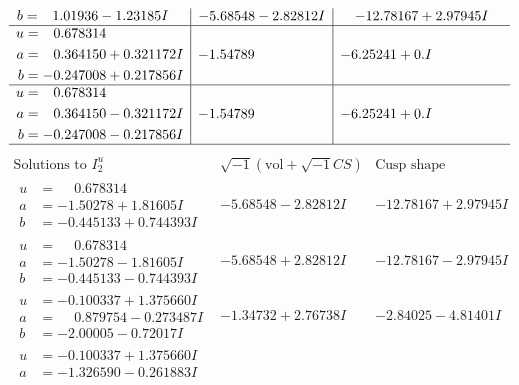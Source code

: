 \documentclass[1p]{elsarticle_modified}
\theoremstyle{definition}
\newcommand{\I}{\sqrt{-1}}
\begin{document}
$$\begin{array}{c|c|c}
\begin{aligned}
b &= \phantom{-}1.01936 - 1.23185 I\end{aligned}
 & -5.68548 - 2.82812 I & -12.78167 + 2.97945 I \\ \hline\begin{aligned}
u &= \phantom{-}0.678314\phantom{ +0.000000I} \\
a &= \phantom{-}0.364150 + 0.321172 I \\
b &= -0.247008 + 0.217856 I\end{aligned}
 & -1.54789\phantom{ +0.000000I} & -6.25241 + 0. I\phantom{ +0.000000I} \\ \hline\begin{aligned}
u &= \phantom{-}0.678314\phantom{ +0.000000I} \\
a &= \phantom{-}0.364150 - 0.321172 I \\
b &= -0.247008 - 0.217856 I\end{aligned}
 & -1.54789\phantom{ +0.000000I} & -6.25241 + 0. I\phantom{ +0.000000I}\\
 \hline 
 \end{array}$$\newpage$$\begin{array}{c|c|c}  
\text{Solutions to }I^u_{2}& \I (\text{vol} + \sqrt{-1}CS) & \text{Cusp shape}\\
 \hline 
\begin{aligned}
u &= \phantom{-}0.678314\phantom{ +0.000000I} \\
a &= -1.50278 + 1.81605 I \\
b &= -0.445133 + 0.744393 I\end{aligned}
 & -5.68548 - 2.82812 I & -12.78167 + 2.97945 I \\ \hline\begin{aligned}
u &= \phantom{-}0.678314\phantom{ +0.000000I} \\
a &= -1.50278 - 1.81605 I \\
b &= -0.445133 - 0.744393 I\end{aligned}
 & -5.68548 + 2.82812 I & -12.78167 - 2.97945 I \\ \hline\begin{aligned}
u &= -0.100337 + 1.375660 I \\
a &= \phantom{-}0.879754 - 0.273487 I \\
b &= -2.00005 - 0.72017 I\end{aligned}
 & -1.34732 + 2.76738 I & -2.84025 - 4.81401 I \\ \hline\begin{aligned}
u &= -0.100337 + 1.375660 I \\
a &= -1.326590 - 0.261883 I \\

\end{aligned}
\end{array}$$
\end{document}
